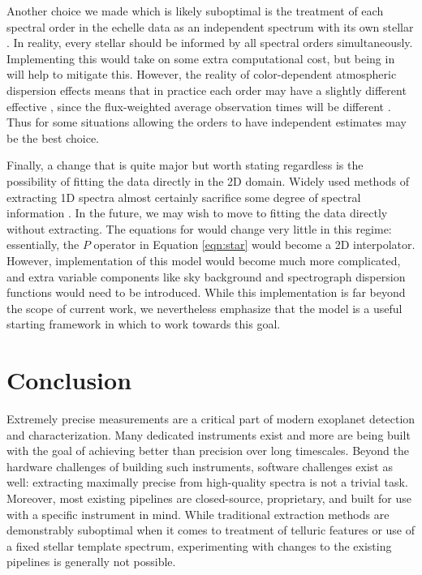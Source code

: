 \documentclass[modern]{aastex62}
\begin{document}
Another choice we made which is likely suboptimal is the treatment of each spectral order in the echelle data as an independent spectrum with its own stellar \RV. 
In reality, every stellar \RV should be informed by all spectral orders simultaneously. 
Implementing this would take on some extra computational cost, but being in \TF will help to mitigate this. 
However, the reality of color-dependent atmospheric dispersion effects means that in practice each order may have a slightly different effective \RV, since the flux-weighted average observation times will be different \citep{Blackman2017}. 
Thus for some situations allowing the orders to have independent \RV estimates may be the best choice.

Finally, a change that is quite major but worth stating regardless is the possibility of fitting the data directly in the 2D domain. 
Widely used methods of extracting 1D spectra almost certainly sacrifice some degree of spectral information \citep{Bolton2010}.
In the future, we may wish to move to fitting the data directly without extracting. 
The equations for \wobble would change very little in this regime: essentially, the $P$ operator in Equation \ref{eqn:star} would become a 2D interpolator. 
However, implementation of this model would become much more complicated, and extra variable components like sky background and spectrograph dispersion functions would need to be introduced. 
While this implementation is far beyond the scope of current work, we nevertheless emphasize that the \wobble model is a useful starting framework in which to work towards this goal.

\section{Conclusion}
\label{s:conclusion}

Extremely precise \RV measurements are a critical part of modern exoplanet detection and characterization. 
Many dedicated \EPRV instruments exist and more are being built with the goal of achieving better than \ms precision over long timescales. 
Beyond the hardware challenges of building such instruments, software challenges exist as well: extracting maximally precise \RVs from high-quality spectra is not a trivial task. 
Moreover, most existing \EPRV pipelines are closed-source, proprietary, and built for use with a specific instrument in mind. 
While traditional \RV extraction methods are demonstrably suboptimal when it comes to treatment of telluric features or use of a fixed stellar template spectrum, experimenting with changes to the existing pipelines is generally not possible.
\end{document}
